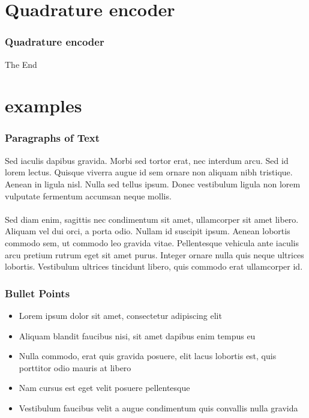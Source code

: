 \documentclass{beamer}
\begin{document}
\section{Quadrature encoder} %
\begin{frame}
	\frametitle{Quadrature encoder}
	
\end{frame}


\begin{frame}
\Huge{\centerline{The End}}
\end{frame}



\section{examples} %
\begin{frame}
\frametitle{Paragraphs of Text}
Sed iaculis dapibus gravida. Morbi sed tortor erat, nec interdum arcu. Sed id lorem lectus. Quisque viverra augue id sem ornare non aliquam nibh tristique. Aenean in ligula nisl. Nulla sed tellus ipsum. Donec vestibulum ligula non lorem vulputate fermentum accumsan neque mollis.\\~\\

Sed diam enim, sagittis nec condimentum sit amet, ullamcorper sit amet libero. Aliquam vel dui orci, a porta odio. Nullam id suscipit ipsum. Aenean lobortis commodo sem, ut commodo leo gravida vitae. Pellentesque vehicula ante iaculis arcu pretium rutrum eget sit amet purus. Integer ornare nulla quis neque ultrices lobortis. Vestibulum ultrices tincidunt libero, quis commodo erat ullamcorper id.
\end{frame}


\begin{frame}
\frametitle{Bullet Points}
\begin{itemize}
\item Lorem ipsum dolor sit amet, consectetur adipiscing elit
\item Aliquam blandit faucibus nisi, sit amet dapibus enim tempus eu
\item Nulla commodo, erat quis gravida posuere, elit lacus lobortis est, quis porttitor odio mauris at libero
\item Nam cursus est eget velit posuere pellentesque
\item Vestibulum faucibus velit a augue condimentum quis convallis nulla gravida
\end{itemize}
\end{frame}
\end{document}

